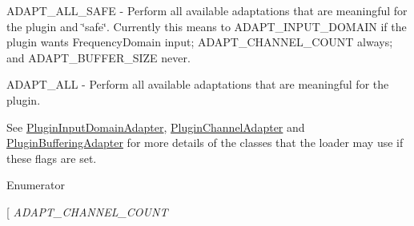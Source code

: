 A\+D\+A\+P\+T\+\_\+\+A\+L\+L\+\_\+\+S\+A\+FE -\/ Perform all available adaptations that are meaningful for the plugin and \char`\"{}safe\char`\"{}. Currently this means to A\+D\+A\+P\+T\+\_\+\+I\+N\+P\+U\+T\+\_\+\+D\+O\+M\+A\+IN if the plugin wants Frequency\+Domain input; A\+D\+A\+P\+T\+\_\+\+C\+H\+A\+N\+N\+E\+L\+\_\+\+C\+O\+U\+NT always; and A\+D\+A\+P\+T\+\_\+\+B\+U\+F\+F\+E\+R\+\_\+\+S\+I\+ZE never.

A\+D\+A\+P\+T\+\_\+\+A\+LL -\/ Perform all available adaptations that are meaningful for the plugin.

See \hyperlink{class_vamp_1_1_host_ext_1_1_plugin_input_domain_adapter}{Plugin\+Input\+Domain\+Adapter}, \hyperlink{class_vamp_1_1_host_ext_1_1_plugin_channel_adapter}{Plugin\+Channel\+Adapter} and \hyperlink{class_vamp_1_1_host_ext_1_1_plugin_buffering_adapter}{Plugin\+Buffering\+Adapter} for more details of the classes that the loader may use if these flags are set. \begin{Desc}
\item[Enumerator]\par
\begin{description}
\item[{\em 
A\+D\+A\+P\+T\+\_\+\+I\+N\+P\+U\+T\+\_\+\+D\+O\+M\+A\+IN\hypertarget{class_vamp_1_1_host_ext_1_1_plugin_loader_aff3ee11692ce25e0dfb904324cbe3494a763a9a0caf512d9671b90c05c2808a09}{}\label{class_vamp_1_1_host_ext_1_1_plugin_loader_aff3ee11692ce25e0dfb904324cbe3494a763a9a0caf512d9671b90c05c2808a09}
}]\item[{\em 
A\+D\+A\+P\+T\+\_\+\+C\+H\+A\+N\+N\+E\+L\+\_\+\+C\+O\+U\+NT\hypertarget{class_vamp_1_1_host_ext_1_1_plugin_loader_aff3ee11692ce25e0dfb904324cbe3494a54c43b85382d78e8ea8da192bce3a139}{}\label{class_vamp_1_1_host_ext_1_1_plugin_loader_aff3ee11692ce25e0dfb904324cbe3494a54c43b85382d78e8ea8da192bce3a139}
}
\end{description}
\end{Desc}
